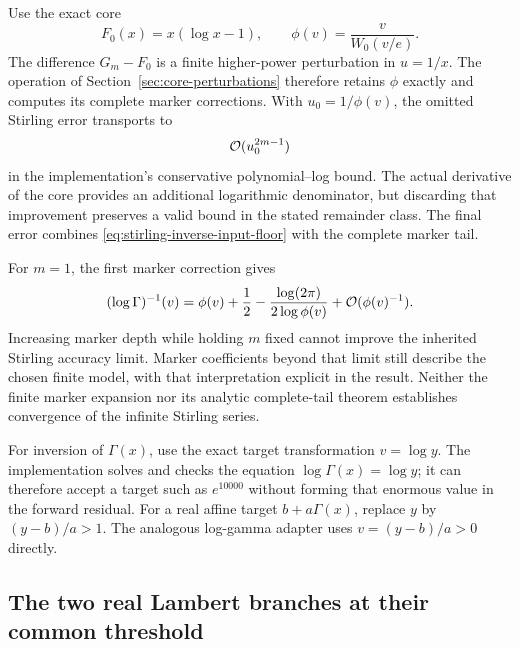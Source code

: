Use the exact core
\begin{equation}
 F_0(x)=x(\log x-1),\qquad
 \phi(v)=\frac{v}{W_0(v/e)}.
 \label{eq:stirling-exact-core}
\end{equation}
The difference $G_m-F_0$ is a finite higher-power perturbation in
$u=1/x$. The operation of Section~\ref{sec:core-perturbations} therefore
retains $\phi$ exactly and computes its complete marker corrections.
With $u_0=1/\phi(v)$, the omitted Stirling error transports to
\begin{equation}
 \mathcal O(u_0^{2m-1})
 \label{eq:stirling-inverse-input-floor}
\end{equation}
in the implementation's conservative polynomial--log bound. The actual
derivative of the core provides an additional logarithmic denominator,
but discarding that improvement preserves a valid bound in the stated
remainder class. The final error combines
\eqref{eq:stirling-inverse-input-floor} with the complete marker tail.

For $m=1$, the first marker correction gives
\begin{equation}
 (\log\Gamma)^{-1}(v)
 =\phi(v)+\frac12-\frac{\log(2\pi)}{2\log\phi(v)}
 +\mathcal O(\phi(v)^{-1}).
 \label{eq:stirling-first-corrected-inverse}
\end{equation}
Increasing marker depth while holding $m$ fixed cannot improve the inherited
Stirling accuracy limit. Marker coefficients beyond that limit still
describe the chosen finite model, with that interpretation explicit in
the result. Neither the finite marker expansion nor its analytic
complete-tail theorem establishes convergence of the infinite Stirling
series.

For inversion of $\Gamma(x)$, use the exact target transformation
$v=\log y$. The implementation solves and checks the equation
$\log\Gamma(x)=\log y$; it can therefore accept a target such as
$e^{10000}$ without forming that enormous value in the forward residual.
For a real affine target $b+a\Gamma(x)$, replace $y$ by $(y-b)/a>1$.
The analogous log-gamma adapter uses $v=(y-b)/a>0$ directly.

\subsection{The two real Lambert branches at their common threshold}

